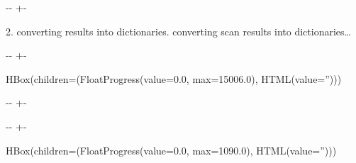 \documentclass[letterpaper,10pt,english]{sphinxmanual}
\newlength\nbsphinxcodecellspacing
\begin{document}
{

\kern-\sphinxverbatimsmallskipamount\kern-\baselineskip
\kern+\FrameHeightAdjust\kern-\fboxrule
\vspace{\nbsphinxcodecellspacing}

\begin{sphinxVerbatim}[commandchars=\\\{\}]

2. converting results into dictionaries.
converting scan results into dictionaries{\ldots}
\end{sphinxVerbatim}
}

{

\kern-\sphinxverbatimsmallskipamount\kern-\baselineskip
\kern+\FrameHeightAdjust\kern-\fboxrule
\vspace{\nbsphinxcodecellspacing}

\begin{sphinxVerbatim}[commandchars=\\\{\}]
HBox(children=(FloatProgress(value=0.0, max=15006.0), HTML(value='')))
\end{sphinxVerbatim}
}

{

\kern-\sphinxverbatimsmallskipamount\kern-\baselineskip
\kern+\FrameHeightAdjust\kern-\fboxrule
\vspace{\nbsphinxcodecellspacing}

\begin{sphinxVerbatim}[commandchars=\\\{\}]

\end{sphinxVerbatim}
}

{

\kern-\sphinxverbatimsmallskipamount\kern-\baselineskip
\kern+\FrameHeightAdjust\kern-\fboxrule
\vspace{\nbsphinxcodecellspacing}

\begin{sphinxVerbatim}[commandchars=\\\{\}]
HBox(children=(FloatProgress(value=0.0, max=1090.0), HTML(value='')))
\end{sphinxVerbatim}
}
\end{document}
